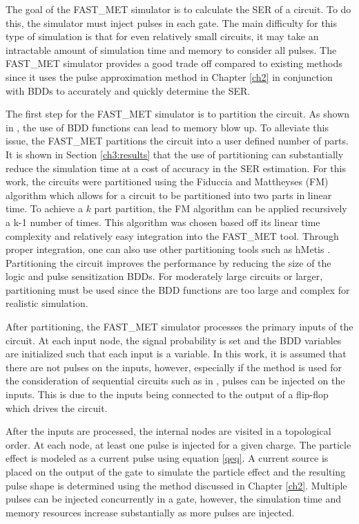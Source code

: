 The goal of the FAST\_MET simulator is to calculate the SER of a circuit. To do this, the simulator must inject pulses in each gate. The main difficulty for this type of simulation is that for even relatively small circuits, it may take an intractable amount of simulation time and memory to consider all pulses. The FAST\_MET simulator provides a good trade off compared to existing methods since it uses the pulse approximation method in Chapter \ref{ch2} in conjunction with BDDs to accurately and quickly determine the SER.

The first step for the FAST\_MET simulator is to partition the circuit. As shown in \cite{FASER,METSys}, the use of BDD functions can lead to memory blow up. To alleviate this issue, the FAST\_MET partitions the circuit into a user defined number of parts. It is shown in Section \ref{ch3:results} that the use of partitioning can substantially reduce the simulation time at a cost of accuracy in the SER estimation. For this work, the circuits were partitioned using the Fiduccia and Mattheyses (FM) algorithm \cite{Fiduccia1982} which allows for a circuit to be partitioned into two parts in linear time. To achieve a $k$ part partition, the FM algorithm can be applied recursively a k-1 number of times. This algorithm was chosen based off its linear time complexity and relatively easy integration into the FAST\_MET tool. Through proper integration, one can also use other partitioning tools such as hMetis \cite{hMetis}. Partitioning the circuit improves the performance by reducing the size of the logic and pulse sensitization BDDs. For moderately large circuits or larger, partitioning must be used since the BDD functions are too large and complex for realistic simulation.

After partitioning, the FAST\_MET simulator processes the primary inputs of the circuit. At each input node, the signal probability is set and the BDD variables are initialized such that each input is a variable. In this work, it is assumed that there are not pulses on the inputs, however, especially if the method is used for the consideration of sequential circuits such as in \cite{MiskovZivanov2007}, pulses can be injected on the inputs. This is due to the inputs being connected to the output of a flip-flop which drives the circuit.

After the inputs are processed, the internal nodes are visited in a topological order. At each node, at least one pulse is injected for a given charge. The particle effect is modeled as a current pulse using equation \ref{qeq}. A current source is placed on the output of the gate to simulate the particle effect and the resulting pulse shape is determined using the method discussed in Chapter \ref{ch2}. Multiple pulses can be injected concurrently in a gate, however, the simulation time and memory resources increase substantially as more pulses are injected.

